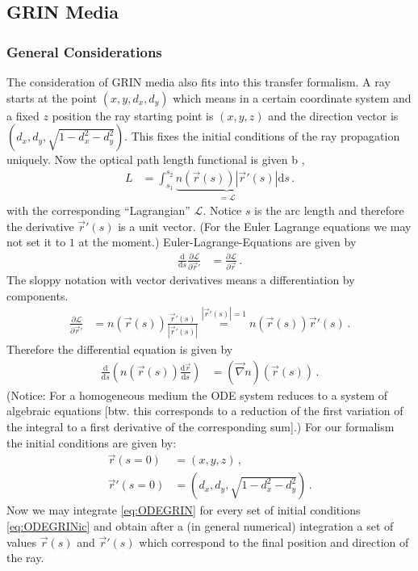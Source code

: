 \documentclass[12pt,a4paper,twoside,openright,BCOR10mm,headsepline,titlepage,abstracton,chapterprefix,final]{scrreprt}
\begin{document}
\subsection{GRIN Media}

\subsubsection{General Considerations}
The consideration of GRIN media also fits into this transfer formalism.
A ray starts at the point $(x,y,d_x,d_y)$ which means in a certain coordinate system
and a fixed $z$ position the ray starting point is $(x,y,z)$ and the direction vector
is $(d_x,d_y,\sqrt{1-d_x^2-d_y^2})$. This fixes the initial conditions of the ray propagation
uniquely. Now the optical path length functional is given b ,
\begin{align}
 L &= \int_{s_1}^{s_2} \underbrace{n(\vec{r}(s)) |\vec{r}'(s)|}_{=\mathcal{L}} \text{d}s\,.
\end{align}
with the corresponding ``Lagrangian'' $\mathcal{L}$.
Notice $s$ is the arc length and therefore the derivative $\vec{r}'(s)$ is a unit vector. (For the Euler Lagrange
equations we may not set it to $1$ at the moment.)
Euler-Lagrange-Equations are given by
\begin{align}
 \frac{\text{d}}{\text{d}s} \frac{\partial \mathcal{L}}{\partial \vec{r}'} &= \frac{\partial \mathcal{L}}{\partial \vec{r}}\,.
\end{align}
The sloppy notation with vector derivatives means a differentiation by components.
\begin{align}
 \frac{\partial \mathcal{L}}{\partial \vec{r}'} &= n(\vec{r}(s)) \frac{\vec{r}'(s)}{|\vec{r}'(s)|} \stackrel{|\vec{r}'(s)|=1}{=} n(\vec{r}(s))\vec{r}'(s)\,.
\end{align}
Therefore the differential equation is given by
\begin{align}
 \frac{\text{d}}{\text{d}s} \left(n(\vec{r}(s)) \frac{\text{d}\vec{r}}{\text{d}s}\right) &= (\vec{\nabla} n)(\vec{r}(s)) \label{eq:ODEGRIN}\,.
\end{align}
(Notice: For a homogeneous medium the ODE system reduces to a system of algebraic equations [btw. this corresponds to a reduction of the
first variation of the integral to a first derivative of the corresponding sum].) 
For our formalism the initial conditions are given by:
\begin{subequations}
\label{eq:ODEGRINic}
\begin{align}
 \vec{r}(s=0) &= (x,y,z)\,,\\
 \vec{r}'(s=0) &= (d_x, d_y, \sqrt{1-d_x^2-d_y^2})\,.
\end{align}
\end{subequations}
Now we may integrate \eqref{eq:ODEGRIN} for every set of initial conditions \eqref{eq:ODEGRINic}
and obtain after a (in general numerical) integration a set of values $\vec{r}(s)$ and $\vec{r}'(s)$
which correspond to the final position and direction of the ray.
\end{document}
